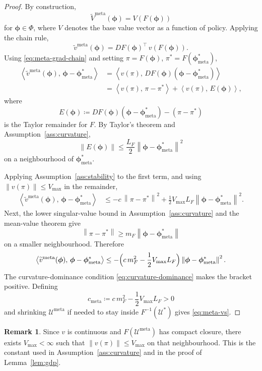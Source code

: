 \documentclass[11pt]{article}
\theoremstyle{definition}
\newtheorem{remark}[theorem]{Remark}
\newcommand{\norm}[1]{\left\lVert #1 \right\rVert}
\newcommand{\inner}[2]{\left\langle #1,\,#2 \right\rangle}
\newcommand{\calU}{\mathcal{U}}
\newcommand{\meta}{\mathrm{meta}}
\begin{document}
\begin{proof}
By construction,
\[
\widetilde V^\meta(\bm\phi)=V(F(\bm\phi))
\]
for $\bm\phi\in\Phi$, where $V$ denotes the base value vector as a function of policy. Applying the chain rule,
\begin{equation}\label{eq:meta-grad-chain}
\widetilde v^\meta(\bm\phi)=DF(\bm\phi)^\top\,v(F(\bm\phi)).
\end{equation}
Using \eqref{eq:meta-grad-chain} and setting $\pi=F(\bm\phi)$, $\pi^*=F(\bm\phi^*_\meta)$,
\begin{align*}
\inner{\widetilde v^\meta(\bm\phi)}{\bm\phi-\bm\phi^*_\meta}
&=\inner{v(\pi)}{DF(\bm\phi)(\bm\phi-\bm\phi^*_\meta)}\\
&=\inner{v(\pi)}{\pi-\pi^*}+\inner{v(\pi)}{E(\bm\phi)},
\end{align*}
where
\[
E(\bm\phi)\coloneqq DF(\bm\phi)(\bm\phi-\bm\phi^*_\meta)-(\pi-\pi^*)
\]
is the Taylor remainder for $F$. By Taylor's theorem and Assumption~\ref{ass:curvature},
\[
\norm{E(\bm\phi)}\le \frac{L_F}{2}\norm{\bm\phi-\bm\phi^*_\meta}^2
\]
on a neighbourhood of $\bm\phi^*_\meta$.

Applying Assumption~\ref{ass:stability} to the first term, and using $\norm{v(\pi)}\le V_{\max}$ in the remainder,
\begin{align*}
\inner{\widetilde v^\meta(\bm\phi)}{\bm\phi-\bm\phi^*_\meta}
&\le -c\,\norm{\pi-\pi^*}^2 + \frac{1}{2}V_{\max}L_F\norm{\bm\phi-\bm\phi^*_\meta}^2.
\end{align*}
Next, the lower singular-value bound in Assumption~\ref{ass:curvature} and the mean-value theorem give
\[
\norm{\pi-\pi^*}\ge m_F\norm{\bm\phi-\bm\phi^*_\meta}
\]
on a smaller neighbourhood. Therefore
\[
\inner{\widetilde v^\meta(\bm\phi)}{\bm\phi-\bm\phi^*_\meta}
\le -\Bigl(c\,m_F^2-\frac{1}{2}V_{\max}L_F\Bigr)\norm{\bm\phi-\bm\phi^*_\meta}^2.
\]
The curvature-dominance condition \eqref{eq:curvature-dominance} makes the bracket positive. Defining
\[
c_\meta\coloneqq c\,m_F^2-\frac{1}{2}V_{\max}L_F>0
\]
and shrinking $\calU^\meta$ if needed to stay inside $F^{-1}(\calU^*)$ gives \eqref{eq:meta-vs}.
\end{proof}

\begin{remark}
Since $v$ is continuous and $F(\calU^\meta)$ has compact closure, there exists $V_{\max}<\infty$ such that $\norm{v(\pi)}\le V_{\max}$ on that neighbourhood. This is the constant used in Assumption~\ref{ass:curvature} and in the proof of Lemma~\ref{lem:gdp}.
\end{remark}
\end{document}
